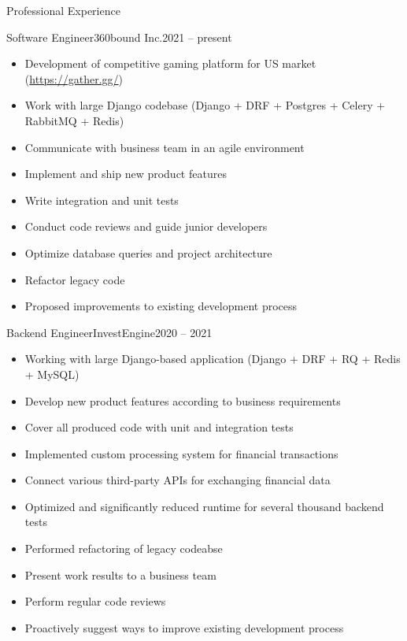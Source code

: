 \documentclass[]{mcdowellcv}
\begin{document}
\makeheader

\begin{cvsection}{Professional Experience}
  
  \begin{cvsubsection}{Software Engineer}{360bound Inc.}{2021 -- present}
    \begin{itemize}
      \item Development of competitive gaming platform for US market (\href{https://gather.gg/}{https://gather.gg/})
      \item Work with large Django codebase (Django + DRF + Postgres + Celery + RabbitMQ + Redis)
      \item Communicate with business team in an agile environment
      \item Implement and ship new product features
      \item Write integration and unit tests
      \item Conduct code reviews and guide junior developers
      \item Optimize database queries and project architecture
      \item Refactor legacy code
      \item Proposed improvements to existing development process
    \end{itemize}
  \end{cvsubsection}

  \begin{cvsubsection}{Backend Engineer}{InvestEngine}{2020 -- 2021}
    \begin{itemize}
      \item Working with large Django-based application (Django + DRF + RQ + Redis + MySQL)
      \item Develop new product features according to business requirements
      \item Cover all produced code with unit and integration tests
      \item Implemented custom processing system for financial transactions
      \item Connect various third-party APIs for exchanging financial data
      \item Optimized and significantly reduced runtime for several thousand backend tests
      \item Performed refactoring of legacy codeabse
      \item Present work results to a business team
      \item Perform regular code reviews
      \item Proactively suggest ways to improve existing development process
    \end{itemize}
  \end{cvsubsection}


\end{cvsection}
\end{document}
